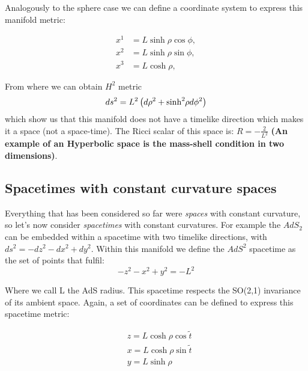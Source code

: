 \documentclass[12pt]{article}
\begin{document}
\vspace{0.5cm}

Analogously to the sphere case we can define a coordinate system to express this manifold metric:

\begin{equation}
\begin{aligned}
    x^1 &= L \sinh{ \rho } \cos{ \phi }, \\
    x^2 &= L \sinh{ \rho } \sin{ \phi }, \\
    x^3 &= L \cosh{ \rho },
\end{aligned}
\end{equation}

From where we can obtain \( H^2 \) metric
\begin{equation}
    ds^2 = L^2 \left( d\rho^2 + \sinh^2{ \hspace{-2pt}\rho } d\phi^2 \right)
\end{equation}
which show us that this manifold does not have a timelike direction which makes it a space (not a space-time). The Ricci scalar of this space is: \( R = - \frac{2}{L^2} \) \textbf{(An example of an Hyperbolic space is the mass-shell condition in two dimensions)}.

\subsection{Spacetimes with constant curvature spaces}

Everything that has been considered so far were \textit{spaces} with constant curvature, so let's now consider \textit{spacetimes} with constant curvatures. For example the \( AdS_2 \) can be embedded within a spacetime with two timelike directions,  with \( ds^2 = -dz^2 - dx^2 + dy^2\). Within this manifold we define the \( AdS^2 \) spacetime as the set of points that fulfil:
\begin{equation}
    -z^2 - x^2 + y^2 = -L^2
\end{equation}

Where we call L the AdS radius. This spacetime respects the SO(2,1) invariance of its ambient space. Again, a set of coordinates can be defined to express this spacetime metric:

\begin{equation}
\begin{aligned}
    & z = L \cosh{ \rho } \cos{ \tilde{t} } \\
    & x = L \cosh{ \rho } \sin{ \tilde{t} } \\
    & y = L \sinh{ \rho }
\end{aligned}
\end{equation}
\end{document}

